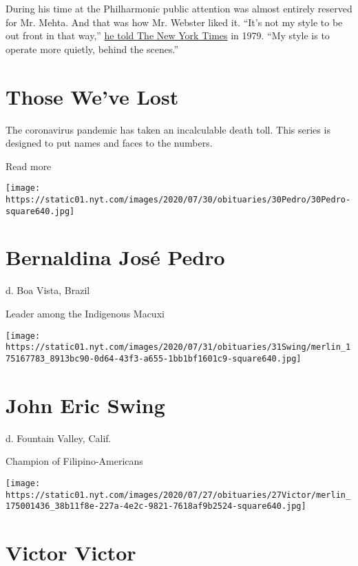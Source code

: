 During his time at the Philharmonic public attention was almost entirely
reserved for Mr. Mehta. And that was how Mr. Webster liked it. ``It's
not my style to be out front in that way,''
\href{https://timesmachine.nytimes.com/timesmachine/1979/09/09/111195056.pdf?pdf_redirect=true\&ip=0}{he
told The New York Times} in 1979. ``My style is to operate more quietly,
behind the scenes.''

\href{https://www.nytimes.com/interactive/2020/obituaries/people-died-coronavirus-obituaries.html?action=click\&pgtype=Article\&state=default\&region=BELOW_MAIN_CONTENT\&context=covid_obits_promo}{}

\hypertarget{those-weve-lost}{%
\section{Those We've Lost}\label{those-weve-lost}}

The coronavirus pandemic has taken an incalculable death toll. This
series is designed to put names and faces to the numbers.

Read more

\texttt{[image: https://static01.nyt.com/images/2020/07/30/obituaries/30Pedro/30Pedro-square640.jpg]}

\hypertarget{bernaldina-josuxe9-pedro}{%
\section{Bernaldina José Pedro}\label{bernaldina-josuxe9-pedro}}

d. Boa Vista, Brazil

Leader among the Indigenous Macuxi

\texttt{[image: https://static01.nyt.com/images/2020/07/31/obituaries/31Swing/merlin\_175167783\_8913bc90-0d64-43f3-a655-1bb1bf1601c9-square640.jpg]}

\hypertarget{john-eric-swing}{%
\section{John Eric Swing}\label{john-eric-swing}}

d. Fountain Valley, Calif.

Champion of Filipino-Americans

\texttt{[image: https://static01.nyt.com/images/2020/07/27/obituaries/27Victor/merlin\_175001436\_38b11f8e-227a-4e2c-9821-7618af9b2524-square640.jpg]}

\hypertarget{victor-victor}{%
\section{Victor Victor}\label{victor-victor}}

